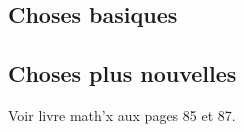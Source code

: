 


\subsection{Choses basiques}


\subsection{Choses plus nouvelles}

Voir livre math'x aux pages 85 et 87.

